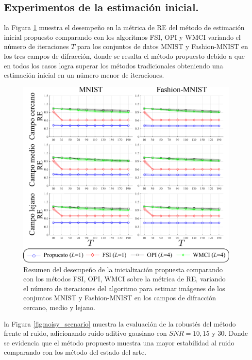 \subsection{Experimentos de la estimación inicial.}


la Figura \ref{fig:results_initializations} muestra el desempeño en la métrica de RE del método de estimación inicial propuesto  comparando con los algoritmos FSI, OPI y WMCI variando el número de iteraciones $T$ para los conjuntos de datos MNIST y Fashion-MNIST en los tres campos de difracción, donde se resalta el método propuesto debido a que en todos los casos logra superar los métodos tradicionales obteniendo una estimación inicial en un número menor de iteraciones.

\begin{figure}[h!]
\centering
         \includegraphics[width=0.8\linewidth]{images/results_initializations.pdf}
        \caption{Resumen del desempeño de la inicialización propuesta comparando con los métodos FSI, OPI, WMCI sobre la métrica de RE, variando el número de iteraciones del algoritmo para estimar imágenes de los conjuntos MNIST y Fashion-MNIST en los campos de difracción cercano, medio y lejano.}
        \label{fig:results_initializations}
\end{figure}



la Figura \ref{fig:noisy_scenario} muestra la evaluación de la robustés del método frente al ruido, adicionando ruido aditivo gausiano con $SNR = 10, 15$ y $30$. Donde se evidencia que el método propuesto muestra una mayor estabilidad al ruido comparando con los método del estado del arte.

